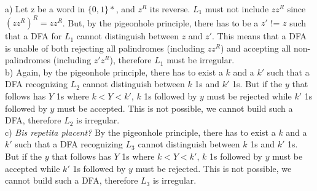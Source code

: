 
a) Let z be a word in $\{0, 1\}*$, and $z^R$ its reverse. $L_1$ must not include $zz^R$ since $(zz^R)^R = zz^R$. 
But, by the pigeonhole principle, there has to be a $z'$ != $z$ such that a DFA for $L_1$ cannot distinguish between $z$ and $z'$. 
This means that a DFA is unable of both rejecting all palindromes (including $zz^R$) and accepting all non-palindromes (including $z'z^R$), therefore $L_1$ must be irregular. \\

b) Again, by the pigeonhole principle, there has to exist a $k$ and a $k'$ such that a DFA recognizing $L_2$ cannot distinguish between $k$ 1s and $k'$ 1s. 
But if the $y$ that follows has $Y$ 1s where $k < Y < k'$, $k$ 1s followed by $y$ must be rejected while $k'$ 1s followed by $y$ must be accepted.
This is not possible, we cannot build such a DFA, therefore $L_2$ is irregular. \\

c) \textit{Bis repetita placent?} By the pigeonhole principle, there has to exist a $k$ and a $k'$ such that a DFA recognizing $L_3$ cannot distinguish between $k$ 1s and $k'$ 1s. 
But if the $y$ that follows has $Y$ 1s where $k < Y < k'$, $k$ 1s followed by $y$ must be accepted while $k'$ 1s followed by $y$ must be rejected.
This is not possible, we cannot build such a DFA, therefore $L_3$ is irregular.
